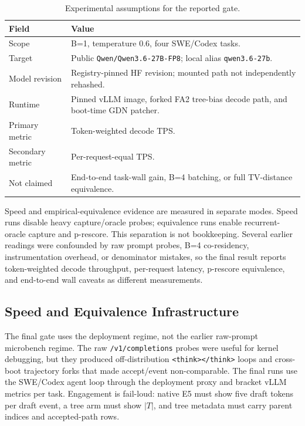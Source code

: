 \documentclass[conference]{IEEEtran}
\newcommand{\code}[1]{\texttt{#1}}
\newcommand{\rowsep}{\specialrule{0.15pt}{1.2pt}{1.2pt}}
\begin{document}
\begin{table}[t]
\caption{Experimental assumptions for the reported gate.}
\label{tab:assumptions}
\centering
\scriptsize
\begin{adjustbox}{width=\columnwidth}
\begin{tabular}{L{0.30\columnwidth} L{0.60\columnwidth}}
\toprule
Field & Value \\
\midrule
Scope & B=1, temperature 0.6, four SWE/Codex tasks. \\
\rowsep
Target & Public \code{Qwen/Qwen3.6-27B-FP8}; local alias \code{qwen3.6-27b}. \\
\rowsep
Model revision & Registry-pinned HF revision; mounted path not independently rehashed. \\
\rowsep
Runtime & Pinned vLLM image, forked FA2 tree-bias decode path, and boot-time GDN patcher. \\
\rowsep
Primary metric & Token-weighted decode TPS. \\
\rowsep
Secondary metric & Per-request-equal TPS. \\
\rowsep
Not claimed & End-to-end task-wall gain, B=4 batching, or full TV-distance equivalence. \\
\bottomrule
\end{tabular}
\end{adjustbox}
\end{table}

Speed and empirical-equivalence evidence are measured in separate modes. Speed runs disable heavy capture/oracle probes; equivalence runs enable recurrent-oracle capture and p-rescore. This separation is not bookkeeping. Several earlier readings were confounded by raw prompt probes, B=4 co-residency, instrumentation overhead, or denominator mistakes, so the final result reports token-weighted decode throughput, per-request latency, p-rescore equivalence, and end-to-end wall caveats as different measurements.

\subsection{Speed and Equivalence Infrastructure}

The final gate uses the deployment regime, not the earlier raw-prompt microbench regime. The raw \code{/v1/completions} probes were useful for kernel debugging, but they produced off-distribution \code{<think></think>} loops and cross-boot trajectory forks that made accept/event non-comparable. The final runs use the SWE/Codex agent loop through the deployment proxy and bracket vLLM metrics per task. Engagement is fail-loud: native E5 must show five draft tokens per draft event, a tree arm must show \(|T|\), and tree metadata must carry parent indices and accepted-path rows.
\end{document}

